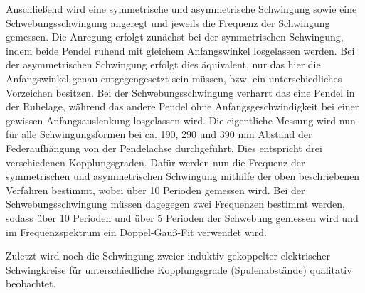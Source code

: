 \documentclass[12pt,a4paper,german]{scrartcl}
\numberwithin{equation}{section}
\begin{document}
  Anschließend wird eine symmetrische und asymmetrische Schwingung sowie eine Schwebungsschwingung angeregt und jeweils die Frequenz der Schwingung gemessen.
  Die Anregung erfolgt zunächst bei der symmetrischen Schwingung, indem beide Pendel ruhend mit gleichem Anfangswinkel losgelassen werden.
  Bei der asymmetrischen Schwingung erfolgt dies äquivalent, nur das hier die Anfangswinkel genau entgegengesetzt sein müssen, bzw. ein unterschiedliches Vorzeichen besitzen.
  Bei der Schwebungsschwingung verharrt das eine Pendel in der Ruhelage, während das andere Pendel ohne Anfangsgeschwindigkeit bei einer gewissen Anfangsauslenkung losgelassen wird.
  Die eigentliche Messung wird nun für alle Schwingungsformen bei ca. 190, 290 und 390 mm Abstand der Federaufhängung von der Pendelachse durchgeführt.
  Dies entspricht drei verschiedenen Kopplungsgraden.
  Dafür werden nun die Frequenz der symmetrischen und asymmetrischen Schwingung mithilfe der oben beschriebenen Verfahren bestimmt, wobei über 10 Perioden gemessen wird.
  Bei der Schwebungsschwingung müssen dagegegen zwei Frequenzen bestimmt werden, sodass über 10 Perioden und über 5 Perioden der Schwebung gemessen wird und im Frequenzspektrum ein Doppel-Gauß-Fit verwendet wird.

  Zuletzt wird noch die Schwingung zweier induktiv gekoppelter elektrischer Schwingkreise für unterschiedliche Kopplungsgrade (Spulenabstände) qualitativ beobachtet.
\end{document}
